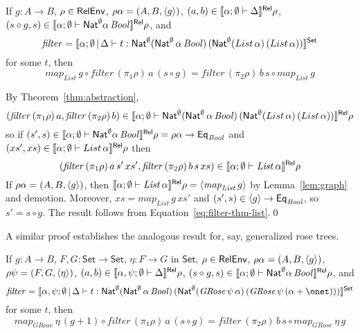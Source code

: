 \documentclass{lmcs}
\theoremstyle{plain}\newtheorem{satz}[thm]{Satz}
\newcommand{\set}{\mathsf{Set}}
\newcommand{\semmap}{\mathit{map}}
\newcommand{\filtype}{\Nat^\emptyset 
 (\Nat^\emptyset \, \alpha \, \mathit{Bool})\, (\Nat^\emptyset 
  (List \, \alpha) \, (List \, \alpha))}
\newcommand{\filtypeGRose}{\Nat^\emptyset 
 (\Nat^\emptyset \, \alpha \, \mathit{Bool})\, (\Nat^\emptyset 
  (\mathit{GRose}\,\psi \, \alpha) \, (\mathit{GRose}\,\psi \, (\alpha
  + \onet)))}
\begin{document}
{\begin{thm} 
If $g : A \to B$, $\rho \in \mathsf{RelEnv}$, $\rho \alpha = (A, B, \langle {g} \rangle)$,
$(a, b) \in \llbracket{\alpha ;\emptyset \vdash \Delta}\rrbracket^{\mathsf{Rel}} \rho$, $(s \circ
g, s) \in \llbracket{\alpha; \emptyset \vdash \mathsf{Nat}^\emptyset \alpha \,
  \mathit{Bool}}\rrbracket^{\mathsf{Rel}} \rho$, and
\[\mathit{filter} = \setsem{\alpha; \emptyset \,|\, \Delta \vdash t :
  \filtype}\]
\noindent
for some $t$, then
\[  \mathit{map}_{\mathit{List}} \,g \circ \mathit{filter} \, (\pi_1
\rho) \, a \, (s \circ g) = \mathit{filter}\, (\pi_2\rho) \, b \, s
\circ \mathit{map}_{\mathit{List}} \,g\]
\end{thm}
\proof
By Theorem~\ref{thm:abstraction}, \[(\mathit{filter}\, (\pi_1 \rho)\,
a, \mathit{filter}\, (\pi_2 \rho)\, b) \in \relsem{\alpha; \emptyset
  \vdash \filtype} \rho\] so if $(s', s) \in \llbracket{\alpha; \emptyset
  \vdash \mathsf{Nat}^\emptyset \alpha \, \mathit{Bool}}\rrbracket^{\mathsf{Rel}} \rho = \rho\alpha \to
\mathsf{Eq}_{\mathit{Bool}}$ and $(xs', xs) \in \llbracket{\alpha; \emptyset
  \vdash List \, \alpha}\rrbracket^{\mathsf{Rel}} \rho$ then
\begin{equation}\label{eq:filter-thm-list}
  (\mathit{filter}\, (\pi_1\rho) \,a \,s' \,xs', \mathit{filter} \,
  (\pi_2\rho) \,b \,s \,xs) \in \llbracket{\alpha; \emptyset \vdash
    \mathit{List} \, \alpha}\rrbracket^{\mathsf{Rel}} \rho
\end{equation}
If $\rho\alpha = (A, B, \langle {g} \rangle)$, then $\llbracket{\alpha; \emptyset
  \vdash \mathit{List} \, \alpha}\rrbracket^{\mathsf{Rel}} \rho =
\langle {\mathit{map}_{\mathit{List}} \, g} \rangle$ by Lemma~\ref{lem:graph}
and demotion.  Moreover, $xs =
\mathit{map}_{\mathit{List}} \,g \,xs'$ and $(s', s) \in \langle {g} \rangle \to
\mathsf{Eq}_{\mathit{Bool}}$, so $s' = s \circ g$. The result
follows from 
Equation~\ref{eq:filter-thm-list}.\qed

A similar proof establishes the analogous result for, say, generalized
rose trees. 
\begin{thm} 
  If $g : A \to B$,
$F, G : \set \to \set$,
  $\eta : F \to G$ in $\set$, $\rho \in \mathsf{RelEnv}$, $\rho \alpha =
 (A, B, \langle {g} \rangle)$, $\rho \psi = (F, G, \langle {\eta} \rangle)$, $(a, b) \in
 \llbracket{\alpha, \psi ;\emptyset \vdash \Delta}\rrbracket^{\mathsf{Rel}} \rho$, $(s \circ
 g, s) \in \llbracket{\alpha; \emptyset \vdash \mathsf{Nat}^\emptyset \alpha \,
   \mathit{Bool}}\rrbracket^{\mathsf{Rel}} \rho$, and
 \[ \mathit{filter} = \setsem{\alpha, \psi; \emptyset \,|\, \Delta
      \vdash t : \filtypeGRose}  \]
for some $t$, then
\[ \semmap_{\mathit{GRose}}\, \eta\, (g + 1) \circ \mathit{filter} \,
(\pi_1 \rho) \, a \, (s \circ g) = \mathit{filter} \, (\pi_2\rho) \, b
\, s \circ 
\semmap_{\mathit{GRose}}\, \eta\, g\]
\end{thm}

}
\end{document}
